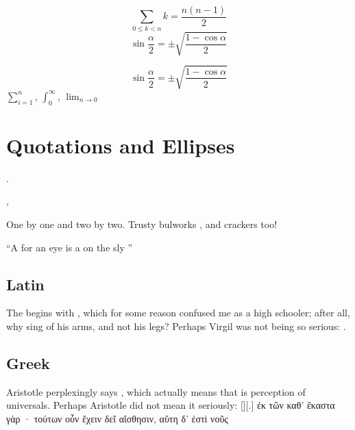 \documentclass[kant]{rhelder3}
\begin{document}
\autokant*[1][1]
\[ \sum_{0\leq k<n} k = \frac{n(n-1)}{2} \]
\autokant*[0][1]
\[ \sin \frac{\alpha}{2} = \pm \sqrt{\frac{1-\cos\alpha}{2}} \]
\autokant*[0][1]

\autokant*[1][1]
\[ \sin \frac{\alpha}{2} = \pm \sqrt{\frac{1-\cos\alpha}{2}} \]
\autokant*[1][2]
\(\sum_{i=1}^n\), \(\int_0^\infty\), \(\lim_{n \to 0}\)
\autokant*[0][2]

\section{Quotations and Ellipses}


.

,

One by one \textellipsis{} and two by two.\thinspace\textellipsis{}
Trusty bulworks \textellipsis, and crackers too!

\enquote{A  for an eye is a  on the sly \textelp{}}

\subsection{Latin}

The  begins with
,
which for some reason confused me as a high schooler;
after all, why sing of his arms, and not his legs?
Perhaps Virgil was not being so serious:
.

\subsection{Greek}

Aristotle perplexingly says
,
which actually means that 
is perception of universals.
Perhaps Aristotle did not mean it seriously:
[][.]{%
  ἐκ τῶν καθ' ἕκαστα γὰρ ·
  τούτων οὖν ἔχειν δεῖ αἴσθησιν, αὕτη δ' ἐστὶ νοῦς%
}
\end{document}
